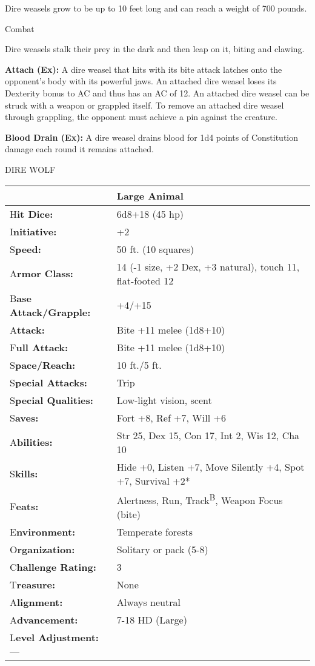 \documentclass{article}
\begin{document}
Dire weasels grow to be up to 10 feet long and can reach a weight of 700 pounds.

Combat

Dire weasels stalk their prey in the dark and then leap on it, biting and clawing.

\textbf{Attach (Ex): }A dire weasel that hits with its bite attack latches onto 
the opponent's body with its powerful jaws. An attached dire weasel loses its Dexterity 
bonus to AC and thus has an AC of 12. An attached dire weasel can be struck with 
a weapon or grappled itself. To remove an attached dire weasel through grappling, 
the opponent must achieve a pin against the creature.

\textbf{Blood Drain (Ex): }A dire weasel drains blood for 1d4 points of Constitution 
damage each round it remains attached.

\vspace{12pt}
DIRE WOLF

\begin{tabular}{|>{\raggedright}p{89pt}|>{\raggedright}p{236pt}|}
\hline
  & Large Animal\tabularnewline
\hline
H\textbf{it Dice:} & 6d8+18 (45 hp)\tabularnewline
\hline
I\textbf{nitiative:} & +2\tabularnewline
\hline
S\textbf{peed:} & 50 ft. (10 squares)\tabularnewline
\hline
A\textbf{rmor Class:} & 14 (-1 size, +2 Dex, +3 natural), touch 11, flat-footed 
12\tabularnewline
\hline
B\textbf{ase Attack/Grapple:} & +4/+15\tabularnewline
\hline
A\textbf{ttack:} & Bite +11 melee (1d8+10)\tabularnewline
\hline
F\textbf{ull Attack:} & Bite +11 melee (1d8+10)\tabularnewline
\hline
S\textbf{pace/Reach:} & 10 ft./5 ft.\tabularnewline
\hline
S\textbf{pecial Attacks:} & Trip\tabularnewline
\hline
S\textbf{pecial Qualities:} & Low-light vision, scent\tabularnewline
\hline
S\textbf{aves:} & Fort +8, Ref +7, Will +6\tabularnewline
\hline
A\textbf{bilities:} & Str 25, Dex 15, Con 17, Int 2, Wis 12, Cha 10\tabularnewline
\hline
S\textbf{kills:} & Hide +0, Listen +7, Move Silently +4, Spot +7, Survival +2*\tabularnewline
\hline
F\textbf{eats:} & Alertness, Run, Track\textsuperscript{B}, Weapon Focus (bite)\tabularnewline
\hline
E\textbf{nvironment:} & Temperate forests\tabularnewline
\hline
O\textbf{rganization:} & Solitary or pack (5-8)\tabularnewline
\hline
C\textbf{hallenge Rating:} & 3\tabularnewline
\hline
T\textbf{reasure:} & None\tabularnewline
\hline
A\textbf{lignment:} & Always neutral\tabularnewline
\hline
A\textbf{dvancement:} & 7-18 HD (Large)\tabularnewline
\hline
L\textbf{evel Adjustment:}--- & \tabularnewline
\hline
\end{tabular}
\end{document}

